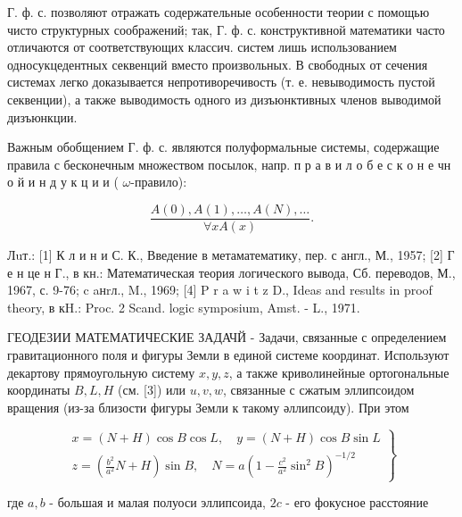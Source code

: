 \documentclass[10pt]{article}
\begin{document}
Г. ф. с. позволяют отражать содержательные особенности теории с помощью чисто структурных соображений; так, Г. ф. с. конструктивной математики часто отличаются от соответствующих классич. систем лишь использованием односукцедентных секвенций вместо произвольных. В свободных от сечения системах легко доказывается непротиворечивость (т. е. невыводимость пустой секвенции), а также выводимость одного из дизъюнктивных членов выводимой дизъюнкции.



Важным обобщением $Г$. ф. с. являются полуформальные системы, содержащие правила с бесконечным множеством посылок, напр. п р а в и л о б е с к о н е чн о й и н д у к ц и и ( $\omega$-правило):



\[

\frac{A(0), A(1), \ldots, A(N), \ldots}{\forall x A(x)} .

\]



Лuт.: [1] К л и н и С. К., Введение в метаматематику, пер. с англ., М., 1957; [2] Г е н це н Г., в кн.: Математическая теория логического вывода, Сб. переводов, М., 1967, с. 9-76; c aнrл., M., 1969; [4] P r a w i t z D., Ideas and results in proof theory, в кH.: Proc. 2 Scand. logic symposium, Amst. - L., 1971.



ГЕОДЕЗИИ МАТЕМАТИЧЕСКИЕ ЗАДАЧЙ - Задачи, связанные с определением гравитационного поля и фигуры Земли в единой системе координат. Используют декартову прямоугольную систему $x, y, z$, а также криволинейные ортогональные координаты $B, L, H$ (см. [3]) или $u, v, w$, связанные с сжатым эллипсоидом вращения (из-за близости фигуры Земли к такому әллипсоиду). При этом



\[

\left.\begin{array}{l}

x=(N+H) \cos B \cos L, \quad y=(N+H) \cos B \sin L \\

z=\left(\frac{b^{2}}{a^{2}} N+H\right) \sin B, \quad N=a\left(1-\frac{c^{2}}{a^{2}} \sin ^{2} B\right)^{-1 / 2}

\end{array}\right\}

\]



где $a, b$ - большая и малая полуоси эллипсоида, $2 c$ - его фокусное расстояние
\end{document}
